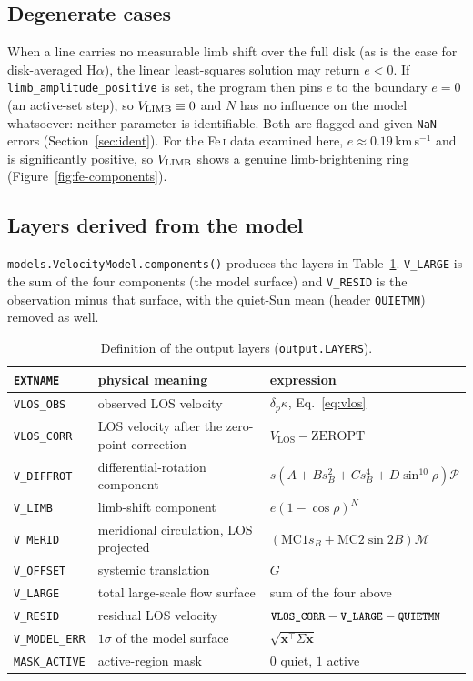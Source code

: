 \documentclass[11pt,a4paper]{article}
\newcommand{\code}[1]{\texttt{\small #1}}
\newcommand{\vlos}{V_{\mathrm{LOS}}}
\newcommand{\Proj}{\mathcal{P}}
\newcommand{\Merid}{\mathcal{M}}
\begin{document}
\subsection{Degenerate cases}
When a line carries no measurable limb shift over the full disk (as is the case
for disk-averaged H$\alpha$), the linear least-squares solution may return
$e<0$.  If \code{limb\_amplitude\_positive} is set, the program then pins $e$ to
the boundary $e=0$ (an active-set step), so $V_{\rm LIMB}\equiv0$ and $N$ has no
influence on the model whatsoever: neither parameter is identifiable.  Both are
flagged and given \code{NaN} errors (Section~\ref{sec:ident}).  For the Fe\,\textsc{i}
data examined here, $e\approx0.19$\,km\,s$^{-1}$ and is significantly positive,
so $V_{\rm LIMB}$ shows a genuine limb-brightening ring
(Figure~\ref{fig:fe-components}).

\subsection{Layers derived from the model}
\code{models.VelocityModel.components()} produces the layers in
Table~\ref{tab:layers}.  \code{V\_LARGE} is the sum of the four components (the
model surface) and \code{V\_RESID} is the observation minus that surface, with
the quiet-Sun mean (header \code{QUIETMN}) removed as well.

\begin{table}[htbp]
\centering
\small
\caption{Definition of the output layers (\code{output.LAYERS}).}
\label{tab:layers}
\begin{tabular}{@{}lll@{}}
\toprule
\code{EXTNAME} & physical meaning & expression \\
\midrule
\code{VLOS\_OBS}   & observed LOS velocity & $\delta_p\kappa$, Eq.~\eqref{eq:vlos} \\
\code{VLOS\_CORR}  & LOS velocity after the zero-point correction & $\vlos - \mathrm{ZEROPT}$ \\
\code{V\_DIFFROT}  & differential-rotation component & $s(A+B s_B^2+C s_B^4+D\sin^{10}\!\rho)\Proj$ \\
\code{V\_LIMB}     & limb-shift component & $e(1-\cos\rho)^N$ \\
\code{V\_MERID}    & meridional circulation, LOS projected & $(\mathrm{MC1}s_B+\mathrm{MC2}\sin2B)\Merid$ \\
\code{V\_OFFSET}   & systemic translation & $G$ \\
\code{V\_LARGE}    & total large-scale flow surface & sum of the four above \\
\code{V\_RESID}    & residual LOS velocity & $\code{VLOS\_CORR}-\code{V\_LARGE}-\code{QUIETMN}$ \\
\code{V\_MODEL\_ERR} & $1\sigma$ of the model surface & $\sqrt{\bm{x}^\top\Sigma\bm{x}}$ \\
\code{MASK\_ACTIVE} & active-region mask & $0$ quiet, $1$ active \\
\bottomrule
\end{tabular}
\end{table}
\end{document}
